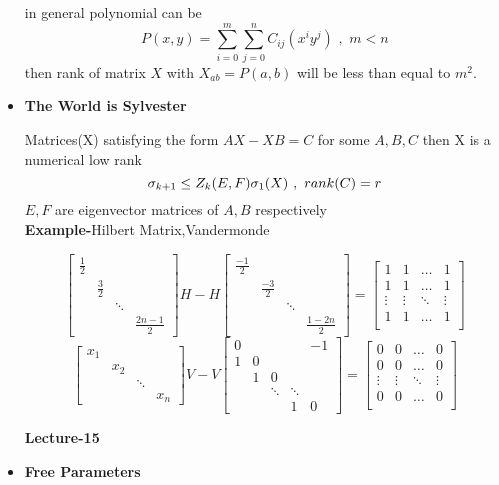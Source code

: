 \documentclass[a4paper]{article}
\numberwithin{equation}{section}
\begin{document}
\begin{itemize}
in general polynomial can be
\[P(x,y)=\sum_{i=0}^{m}\sum_{j=0}^{n}C_{ij}\left(x^iy^j\right) \hspace{4pt},\hspace{4pt} m<n\]
then rank of matrix $X$ with $X_{ab}=P(a,b)$ will be less than equal to $m^2$.

\item \textbf{The World is Sylvester} 

Matrices(X) satisfying the form $AX-XB=C$ for some $A,B,C$ then X is a numerical low rank
\[\sigma_{k+1}\leq Z_k(E,F)\sigma_1(X)\hspace{3.5pt},\hspace{3.5pt} rank(C)=r\]
$E,F$ are eigenvector matrices of $A,B$ respectively\\

\textbf{Example-}Hilbert Matrix,Vandermonde

\[
\begin{bmatrix}
    \frac{1}{2}&&&\\
    &\frac{3}{2}&&\\
    &&\ddots&\\
    &&&\frac{2n-1}{2}
\end{bmatrix}H-
H\begin{bmatrix}
    \frac{-1}{2}&&&\\
    &\frac{-3}{2}&&\\
    &&\ddots&\\
    &&&\frac{1-2n}{2}
\end{bmatrix}=
\begin{bmatrix}
    1&1&\dots&1\\
    1&1&\dots&1\\
    \vdots&\vdots&\ddots&\vdots\\
    1&1&\dots&1\\
\end{bmatrix}
\]
\[
\begin{bmatrix}
    x_1&&&\\
    &x_2&&\\
    &&\ddots&\\
    &&&x_n
\end{bmatrix}V-
V\begin{bmatrix}
    0&&&&-1\\
    1&0&&&\\
    &1&0&&\\
    &&\ddots&\ddots&\\
    &&&1&0
\end{bmatrix}=
\begin{bmatrix}
    0&0&\dots&0\\
    0&0&\dots&0\\
    \vdots&\vdots&\ddots&\vdots\\
    0&0&\dots&0\\
\end{bmatrix}
\]
\begin{center}
    \textbf{\Huge{Lecture-15}}
\end{center}
\item \textbf{Free Parameters}


\end{itemize}
\end{document}
